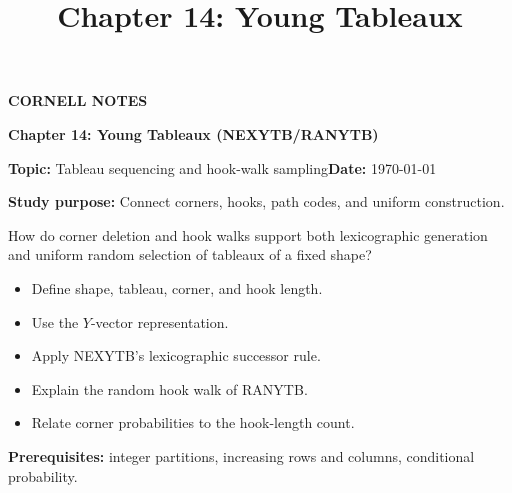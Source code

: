 \documentclass[10pt,letterpaper]{article}
\title{Chapter 14: Young Tableaux}
\author{}
\date{}
\begin{document}
\maketitle
\begin{tcolorbox}[colback=Paper,colframe=Ink]{\small\bfseries\color{Teal}CORNELL NOTES}\par{\LARGE\bfseries Chapter 14: Young Tableaux (NEXYTB/RANYTB)}\par\medskip\textbf{Topic:} Tableau sequencing and hook-walk sampling\hfill\textbf{Date:} \today\par\textbf{Study purpose:} Connect corners, hooks, path codes, and uniform construction.\end{tcolorbox}
\begin{tcolorbox}[colback=Teal!5,colframe=Teal,title=Essential question]How do corner deletion and hook walks support both lexicographic generation and uniform random selection of tableaux of a fixed shape?\end{tcolorbox}
\begin{tcolorbox}[colback=white,colframe=Mist,title=Learning objectives]\begin{itemize}\item Define shape, tableau, corner, and hook length.\item Use the $Y$-vector representation.\item Apply NEXYTB's lexicographic successor rule.\item Explain the random hook walk of RANYTB.\item Relate corner probabilities to the hook-length count.\end{itemize}\textbf{Prerequisites:} integer partitions, increasing rows and columns, conditional probability.\end{tcolorbox}
\end{document}
